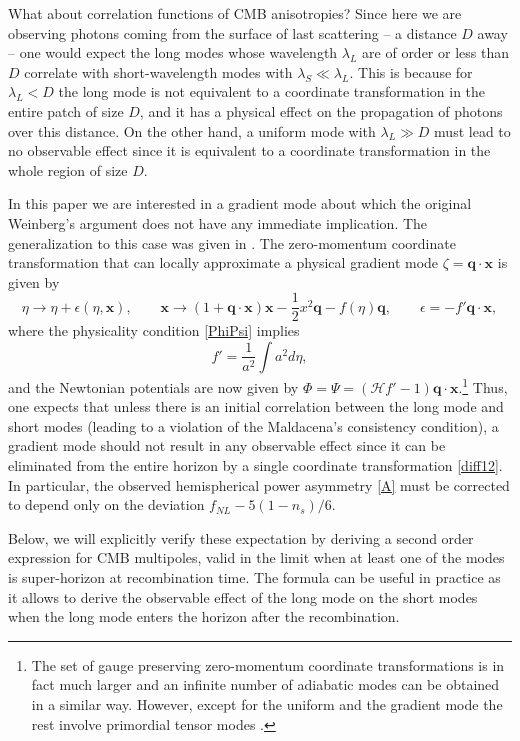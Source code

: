 \documentclass[12pt]{article}
\numberwithin{equation}{section}
\def\bsb{\boldsymbol}
\def\be{\begin{equation}}
\def\ee{\end{equation}}
\def\ep{\epsilon}
\def\cH{\mathcal{H}}
\begin{document}
What about correlation functions of CMB anisotropies? Since here we are observing photons coming from the surface of last scattering -- a distance $D$ away -- one would expect the long modes whose wavelength $\lambda_L$ are of order or less than $D$ correlate with short-wavelength modes with $\lambda_S\ll \lambda_L$. This is because for $\lambda_L<D$ the long mode is not equivalent to a coordinate transformation in the entire patch of size $D$, and it has a physical effect on the propagation of photons over this distance. On the other hand, a uniform mode with $\lambda_L\gg D$ must lead to no observable effect since it is equivalent to a coordinate transformation in the whole region of size $D$.

In this paper we are interested in a gradient mode about which the original Weinberg's argument does not have any immediate implication. The generalization to this case was given in \cite{Creminelli_sct,Hinterbichler_adia}. The zero-momentum coordinate transformation that can locally approximate a physical gradient mode $\zeta = \bsb q\cdot \bsb x$ is given by 
\be
\label{diff12}
\eta\to \eta+\ep(\eta,\bsb x),\qquad \bsb x\to (1+\bsb q\cdot \bsb x)\bsb x-\frac{1}{2}x^2 \bsb q -f(\eta)\bsb q , \qquad 
\ep =- f' \bsb q\cdot \bsb x,
\ee
where the physicality condition \eqref{PhiPsi} implies
\be
f'=\frac{1}{a^2}\int a^2 d\eta,
\ee
and the Newtonian potentials are now given by $\Phi =\Psi = (\cH f' -1)\bsb q\cdot \bsb x $.\footnote{The set of gauge preserving zero-momentum coordinate transformations is in fact much larger and an infinite number of adiabatic modes can be obtained in a similar way. However, except for the uniform and the gradient mode the rest involve primordial tensor modes \cite{Hinterbichler}.} 
Thus, one expects that unless there is an initial correlation between the long mode and short modes (leading to a violation of the Maldacena's consistency condition), a gradient mode should not result in any observable effect since it can be eliminated from the entire horizon by a single coordinate transformation \eqref{diff12}. In particular, the observed hemispherical power asymmetry \eqref{A} must be corrected to depend only on the deviation $f_{NL} - 5(1-n_s)/6$. 

Below, we will explicitly verify these expectation by deriving a second order expression for CMB multipoles, valid in the limit when at least one of the modes is super-horizon at recombination time. The formula can be useful in practice as it allows to derive the observable effect of the long mode on the short modes when the long mode enters the horizon after the recombination. 
\end{document}

